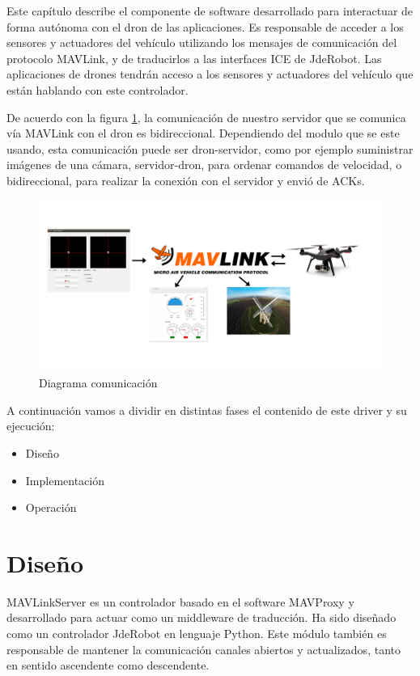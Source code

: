 Este capítulo describe el componente de software desarrollado para interactuar de forma autónoma con el dron de las aplicaciones. Es responsable de acceder a los sensores y actuadores del vehículo utilizando los mensajes de comunicación del protocolo MAVLink, y de traducirlos a las interfaces ICE de JdeRobot. Las aplicaciones de drones tendrán acceso a los sensores y actuadores del vehículo que están hablando con este controlador.

De acuerdo con la figura \ref{fig:diagramaComunicacionServerDron1}, la comunicación de nuestro servidor que se comunica vía MAVLink con el dron es bidireccional. Dependiendo del modulo que se este usando, esta comunicación puede ser dron-servidor, como por ejemplo suministrar imágenes de una cámara, servidor-dron, para ordenar comandos de velocidad, o bidireccional, para realizar la conexión con el servidor y envió de ACKs. 

\begin{figure}[H]
  \centering
  \includegraphics[scale=0.1]{imagenes/diagramaComunicacionServerDron1.png}
  \caption{Diagrama comunicación}
  \label{fig:diagramaComunicacionServerDron1}
\end{figure}


A continuación vamos a dividir en distintas fases el contenido de este driver y su ejecución:

\begin{itemize}
\item Diseño
\item Implementación
\item Operación
\end{itemize}

\section{Diseño}
\label{Diseno}
MAVLinkServer es un controlador basado en el software MAVProxy y desarrollado para actuar como un middleware de traducción. Ha sido diseñado como un controlador JdeRobot en lenguaje Python. Este módulo también es responsable de mantener la comunicación canales abiertos y actualizados, tanto en sentido ascendente como descendente. 

